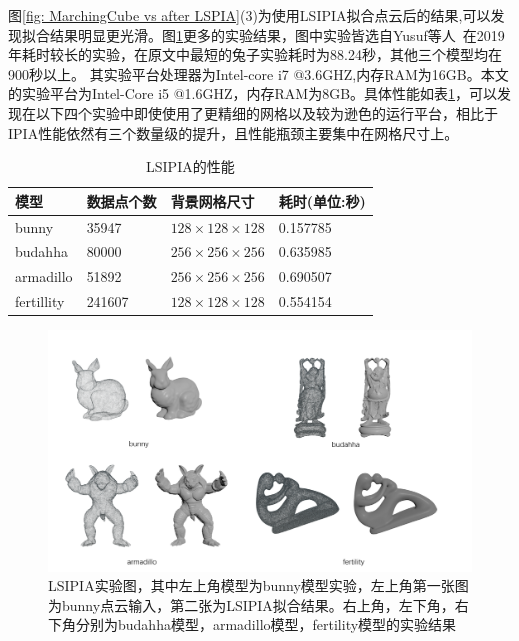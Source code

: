 图\ref{fig: MarchingCube vs after LSPIA}(3)为使用LSIPIA拟合点云后的结果,可以发现拟合结果明显更光滑。图\ref{fig: LSIPIA_experience}更多的实验结果，图中实验皆选自Yusuf等人~\cite{hamza2020implicit}在2019年耗时较长的实验，在原文中最短的兔子实验耗时为88.24秒，其他三个模型均在900秒以上。
其实验平台处理器为Intel-core i7 @3.6GHZ,内存RAM为16GB。本文的实验平台为Intel-Core i5 @1.6GHZ，内存RAM为8GB。具体性能如表\ref{tab:LSIPIA perfomance}，可以发现在以下四个实验中即使使用了更精细的网格以及较为逊色的运行平台，相比于IPIA性能依然有三个数量级的提升，且性能瓶颈主要集中在网格尺寸上。
\begin{table}[htb]
    \centering
    \caption{LSIPIA的性能}
    \label{tab:LSIPIA perfomance}
      \begin{tabular}{llll}
        \toprule
        模型 & 数据点个数 & 背景网格尺寸& 耗时(单位:秒)\\
        \midrule
        bunny & 35947& $128\times 128\times 128$ &  0.157785\\
        budahha & 80000& $256\times 256\times 256$&  0.635985  \\
        armadillo & 51892& $256\times 256\times 256$& 0.690507 \\
        fertillity & 241607& $128\times 128\times 128$&0.554154 \\
        \bottomrule
      \end{tabular}
\end{table}
\begin{figure}[htbp]
    \centering
    \includegraphics[scale=0.67]{./images/LSIPIA_experience.png}
    \caption{LSIPIA实验图，其中左上角模型为bunny模型实验，左上角第一张图为bunny点云输入，第二张为LSIPIA拟合结果。右上角，左下角，右下角分别为budahha模型，armadillo模型，fertility模型的实验结果}
    \label{fig: LSIPIA_experience}
\end{figure}


